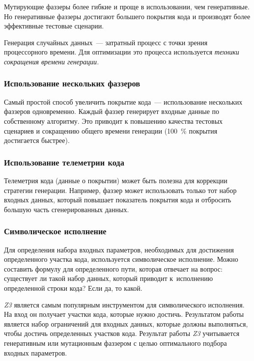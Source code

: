  Мутирующие фаззеры более гибкие и проще в использовании, чем генеративные. Но генеративные фаззеры достигают большего покрытия кода и производят более эффективные тестовые сценарии.
 
 Генерация случайных данных~--- затратный процесс с точки зрения процессорного времени. Для оптимизации это процесса используется    \textit{техники сокращения времени генерации.}
 
 
 \subsubsection{Использование нескольких фаззеров}
 
 Самый простой способ увеличить покрытие кода~--- использование нескольких фаззеров одновременно. Каждый фаззер генерирует входные данные по собственному алгоритму. Это приводит к повышению качества тестовых сценариев и сокращению общего времени генерации (100~\% покрытия достигается быстрее).
 
 \subsubsection{Использование телеметрии кода}
 
 Телеметрия кода (данные о покрытии) может быть полезна для коррекции стратегии генерации. Например, фаззер может использовать только тот набор входных данных, который повышает показатель покрытия кода и отбросить большую часть сгенерированных данных.
  
 \subsubsection{Символическое исполнение}
 
 Для определения набора входных параметров, необходимых для достижения определенного участка кода, используется символическое исполнение. Можно составить формулу для определенного пути, которая отвечает на вопрос: существует ли такой набор данных, который приводит к~исполнению определенной строки кода? Если да, то какой. 
 
\textit{Z3} является самым популярным инструментом для символического исполнения. На вход он получает участки кода, которые нужно достичь. Результатом работы является набор ограничений для входных данных, которые должны выполняться, чтобы достичь определенных участков кода. Результат работы \textit{Z3} учитывается генеративным или мутационным фаззером с целью оптимального подбора входных параметров. 

